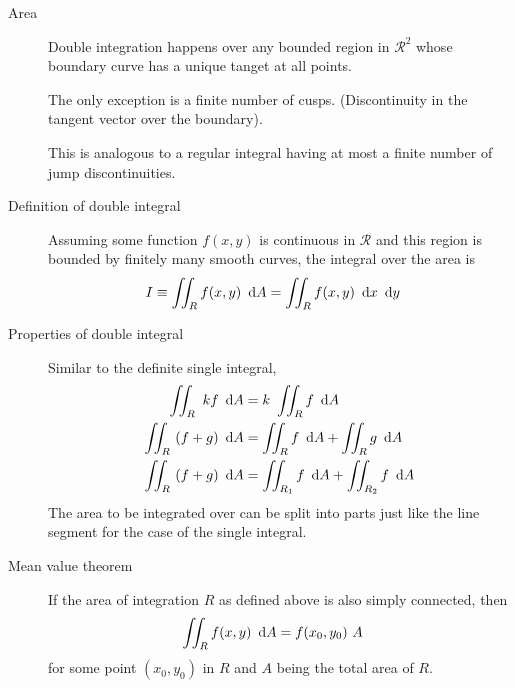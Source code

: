 \begin{description}
    \item[Area] Double integration happens over any bounded region in $ \mathcal{R}^2 $
        whose boundary curve has a unique tanget at all points. \par
        The only exception is a finite number of cusps. (Discontinuity in the tangent
        vector over the boundary). \par
        This is analogous to a regular integral having at most a finite number of jump
        discontinuities.

    \item[Definition of double integral] Assuming some function $ f(x, y) $ is
        continuous in $ \mathcal{R} $ and this region is bounded by finitely many smooth
        curves, the integral over the area is
        \begin{align}
            I & \equiv \iint_R f(x, y)\ \dl A = \iint_R f(x, y)\ \dl x\ \dl y
        \end{align}

    \item[Properties of double integral] Similar to the definite single integral,
        \begin{align}
            \iint_R\ kf\ \dl A    & = k\ \iint_R f\ \dl A                          \\
            \iint_R\ (f+g)\ \dl A & = \iint_R f\ \dl A +  \iint_R g\ \dl A         \\
            \iint_R\ (f+g)\ \dl A & = \iint_{R_1} f\ \dl A +  \iint_{R_2} f\ \dl A
        \end{align}
        The area to be integrated over can be split into parts just like the line segment
        for the case of the single integral.

    \item[Mean value theorem] If the area of integration $ R $ as defined above is also
        simply connected, then
        \begin{align}
            \iint_R f(x, y)\ \dl A & = f(x_0, y_0)\ A
        \end{align}
        for some point $ (x_0, y_0) $ in $ R $ and $ A $ being the total area of $ R $.


\end{description}

